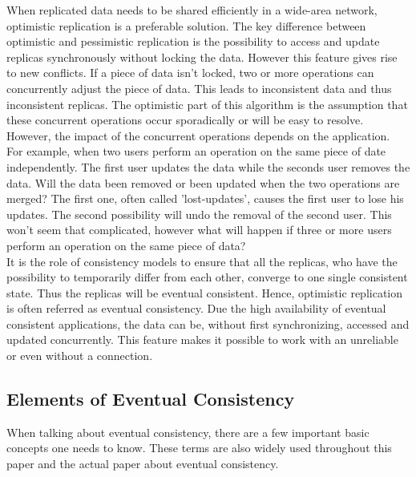 \documentclass[a4paper,12pt]{report}
\begin{document}
When replicated data needs to be shared efficiently in a wide-area network, optimistic replication is a preferable solution. The key difference between optimistic and pessimistic replication is the possibility to access and update replicas synchronously without locking the data. However this feature gives rise to new conflicts. If a piece of data isn't locked, two or more operations can concurrently adjust the piece of data. This leads to inconsistent data and thus inconsistent replicas. The optimistic part of this algorithm is the assumption that these concurrent operations occur sporadically or will be easy to resolve. However, the impact of the concurrent operations depends on the application. \\
\indent For example, when two users perform an operation on the same piece of date independently. The first user updates the data while the seconds user removes the data. Will the data been removed or been updated when the two operations are merged? The first one, often called 'lost-updates', causes the first user to lose his updates. The second possibility will undo the removal of the second user. This won't seem that complicated, however what will happen if three or more users perform an operation on the same piece of data? \\
It is the role of consistency models to ensure that all the replicas, who have the possibility to temporarily differ from each other, converge to one single consistent state. Thus the replicas will be eventual consistent. Hence, optimistic replication is often referred as eventual consistency. Due the high availability of eventual consistent applications, the data can be, without first synchronizing, accessed and updated concurrently. This feature makes it possible to work with an unreliable or even without a connection. \\

\subsection{Elements of Eventual Consistency}

When talking about eventual consistency, there are a few important basic concepts one needs to know. These terms are also widely used throughout this paper and the actual paper about eventual consistency. 
\newline
\end{document}

